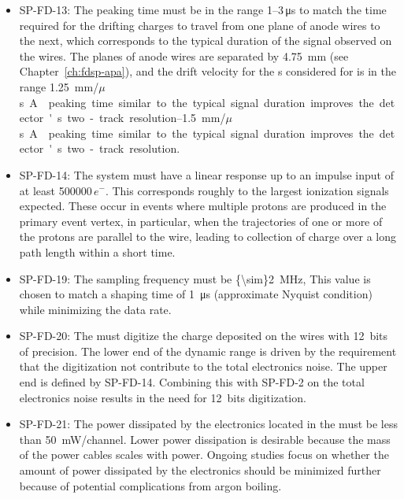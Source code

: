 \begin{itemize}
\item SP-FD-13: The  peaking time must be in the range \numrange{1}{3}\,\si{\micro\second} 
to match the time required for the drifting charges to travel from one plane of anode
wires to the next, which corresponds to the typical duration of the signal observed
on the wires. The planes of anode wires are separated by \SI{4.75}{mm} 
(see Chapter~\ref{ch:fdsp-apa}), and the drift velocity for
the \efield{}s considered for  is in the range
\SIrange{1.25}{1.5}{mm/$\mu$s}. %
A  peaking time  similar to the typical signal duration improves the detector's two-track resolution.  

\item SP-FD-14: The system must have a linear response up to an impulse input of 
at least \num{500000}\,$e^{-}$.  This corresponds roughly to the largest 
ionization signals expected. 
These occur in events where multiple protons are produced 
in the primary event vertex, in particular, when the trajectories of one 
or more of %
the protons are parallel to the wire, %
leading to collection of charge over a long path length within a short time.

\item SP-FD-19:  The  sampling frequency must be \SI{{\sim}2}{MHz},
This value is chosen to match a  shaping time of \SI{1}{\micro\second} 
(approximate Nyquist condition) while minimizing the data rate.

\item SP-FD-20:  The  must digitize the charge deposited on the wires 
with 12~bits of precision.  The lower end of the  dynamic 
range is driven by the requirement that the digitization %
not 
contribute to the total electronics noise. The upper end %
is defined by SP-FD-14. %
Combining this %
with SP-FD-2 %
on the total electronics noise 
results in the need for 12~bits digitization. 

\item SP-FD-21:   The power dissipated by the electronics located in the  must
be less than \SI{50}{mW/channel}. Lower power dissipation is desirable because 
the mass of the power cables scales with  power. 
 Ongoing studies 
focus on whether the amount of power dissipated by the electronics 
should be minimized further 
 because of potential complications from 
argon boiling. %


\end{itemize}
